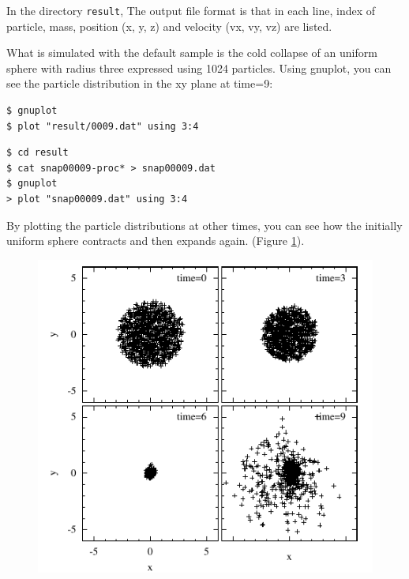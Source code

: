 In the directory \texttt{result},
The output file format is that in each line, index of particle, mass, position (x, y, z) and velocity (vx, vy, vz) are listed.

What is simulated with the default sample is the cold collapse of an uniform sphere with radius three expressed using 1024 particles. Using gnuplot, you can see the particle distribution in the xy plane at time=9:

\ifCpp %
\begin{screen}
\begin{verbatim}
$ gnuplot
$ plot "result/0009.dat" using 3:4
\end{verbatim}
\end{screen}
\endifCpp
\ifIF %
\begin{screen}
\begin{verbatim}
$ cd result
$ cat snap00009-proc* > snap00009.dat
$ gnuplot
> plot "snap00009.dat" using 3:4
\end{verbatim}
\end{screen}
\endifIF

By plotting the particle distributions at other times, you can see
how the initially uniform sphere contracts and then expands again.
(Figure \ref{fig:nbody}).

\begin{figure}
\begin{center}
\includegraphics[width=0.75\linewidth]{fig/nbody.pdf}
\end{center}
\caption{}
\label{fig:nbody}
\end{figure}

